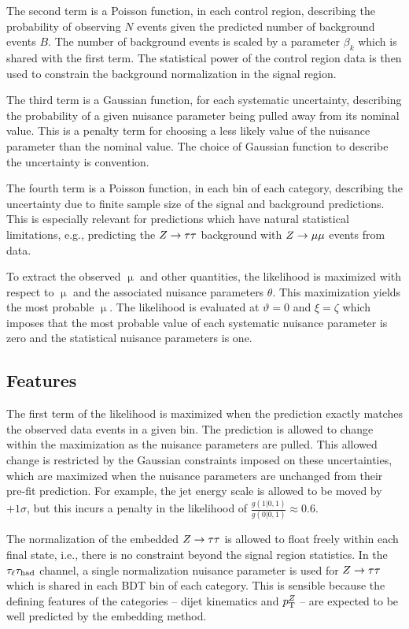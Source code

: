 The second term is a Poisson function, in each control region, describing the probability of observing $N$ events given the predicted number of background events $B$. The number of background events is scaled by a parameter $\beta_k$ which is shared with the first term. The statistical power of the control region data is then used to constrain the background normalization in the signal region.

The third term is a Gaussian function, for each systematic uncertainty, describing the probability of a given nuisance parameter being pulled away from its nominal value. This is a penalty term for choosing a less likely value of the nuisance parameter than the nominal value. The choice of Gaussian function to describe the uncertainty is convention.

The fourth term is a Poisson function, in each bin of each category, describing the uncertainty due to finite sample size of the signal and background predictions. This is especially relevant for predictions which have natural statistical limitations, e.g., predicting the $Z\rightarrow\tau\tau$ background with $Z \rightarrow \mu\mu$ events from data.

To extract the observed $\upmu$ and other quantities, the likelihood is maximized with respect to $\upmu$ and the associated nuisance parameters $\theta$. This maximization yields the most probable $\upmu$. The likelihood is evaluated at $\vartheta = 0$ and $\xi = \zeta$ which imposes that the most probable value of each systematic nuisance parameter is zero and the statistical nuisance parameters is one.

\subsection{Features}

The first term of the likelihood is maximized when the prediction exactly matches the observed data events in a given bin. The prediction is allowed to change within the maximization as the nuisance parameters are pulled. This allowed change is restricted by the Gaussian constraints imposed on these uncertainties, which are maximized when the nuisance parameters are unchanged from their pre-fit prediction. For example, the jet energy scale is allowed to be moved by $+1\sigma$, but this incurs a penalty in the likelihood of $\frac{g(1|0,1)}{g(0|0,1)}\approx 0.6$. 

The normalization of the embedded $Z\rightarrow\tau\tau$ is allowed to float freely within each final state, i.e., there is no constraint beyond the signal region statistics. In the $\tau_\ell\tau_\text{had}$ channel, a single normalization nuisance parameter is used for $Z\rightarrow\tau\tau$ which is shared in each BDT bin of each category. This is sensible because the defining features of the categories -- dijet kinematics and $p_{\mathrm{T}}^Z$ -- are expected to be well predicted by the embedding method.

